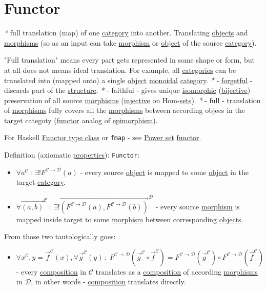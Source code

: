 \documentclass[a4paper,14pt,oneside]{book}
\begin{document}
\section{\label{org3bd25a7}Functor}
\label{sec:org1f9f384}
\emph{*} full translation (map) of one \hyperref[orgfd021ba]{category} into another.
Translating \hyperref[org176276a]{objects} and \hyperref[orgfe88a73]{morphisms} (so as an input can take \hyperref[orge736ce1]{morphism} or \hyperref[orgd191004]{object} of the source \hyperref[orgfd021ba]{category}).

"Full translation" means every part gets represented in some shape or form, but at all does not means ideal translation. For example, all \hyperref[orgf2b47e5]{categories} can be translated into (mapped onto) a single \hyperref[orgd191004]{object} \hyperref[orgbbfdad1]{monoidal} \hyperref[orgfd021ba]{category}.
\emph{*} - \hyperref[org89b0407]{forgetful} - discards part of the \hyperref[org3025fd4]{structure}.
\emph{*} - faithful - gives unique \hyperref[orgfea338a]{isomorphic} (\hyperref[org5cc96a4]{bijective}) preservation of all source \hyperref[orgfe88a73]{morphisms} (\hyperref[org4ffa83c]{injective} on Hom-\hyperref[orgcba0415]{sets}).
\emph{*} - full - translation of \hyperref[orgfe88a73]{morphisms} fully covers all the \hyperref[orgfe88a73]{morphisms} between according objecs in the target categoty (\hyperref[org3bd25a7]{functor} analog of \hyperref[org005aad6]{epimorphism}).

For Haskell \hyperref[org9241fac]{Functor type class} or \texttt{fmap} - see \hyperref[org6dc76ed]{Power set} \hyperref[org3bd25a7]{functor}.

Definition (axiomatic \hyperref[org8cc685d]{properties}):
\texttt{Functor}:
\begin{itemize}
\item \(\forall a^{\mathcal{C}} \ : \ \exists! F^{\mathcal{C \to D}}(a)\) - every source \hyperref[orgd191004]{object} is mapped to some \hyperref[orgd191004]{object} in the target \hyperref[orgfd021ba]{category}.
\item \(\forall \overrightarrow{(a, b)}^{\mathcal{C}} \ : \ \exists! \overrightarrow{(F^{\mathcal{C \to D}}(a),F^{\mathcal{C \to D}}(b))}^{\mathcal{D} }\) - every source \hyperref[orge736ce1]{morphism} is mapped inside target to some \hyperref[orge736ce1]{morphism} between corresponding \hyperref[org176276a]{objects}.
\end{itemize}

From those two tautologically goes:
\begin{itemize}
\item \(\forall {x^{\mathcal{C}}}, y=\overrightarrow{f}^{\mathcal{C}}(x), \forall \overrightarrow{g}^{\mathcal{C}}(y) \ : \ F^{\mathcal{C \to D}}(\overrightarrow{g}^{\mathcal{C}} \circ \overrightarrow{f}^{\mathcal{C}}) = F^{\mathcal{C \to D}}(\overrightarrow{g}^{\mathcal{C}}) \circ F^{\mathcal{C \to D}}(\overrightarrow{f}^{\mathcal{C}})\) - every \hyperref[org6a6c663]{composition} in \(\mathcal{C}\) translates as a \hyperref[org6a6c663]{composition} of according \hyperref[orgfe88a73]{morphisms} in \(\mathcal{D}\), in other words - \hyperref[org6a6c663]{composition} translates directly.
\end{itemize}
\end{document}

